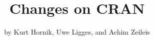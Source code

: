 \title{Changes on CRAN}
\author{by Kurt Hornik, Uwe Ligges, and Achim Zeileis}

\maketitle

\begin{verbatim}
\end{verbatim}


\address{%
Kurt Hornik\\
\\%
\\
%
%
%
%
}

\address{%
Uwe Ligges\\
\\%
\\
%
%
%
%
}

\address{%
Achim Zeileis\\
\\%
\\
%
%
%
%
}
